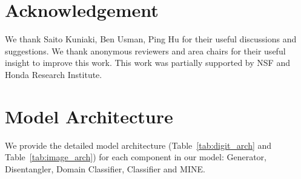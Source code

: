 \documentclass{article}
\begin{document}
\section{Acknowledgement}

We thank Saito Kuniaki, Ben Usman, Ping Hu for their useful discussions and suggestions. We thank anonymous reviewers and area chairs for their useful insight to improve this work. This work was partially supported by NSF and Honda Research Institute. 





\clearpage


\appendix
{}
\section{Model Architecture}
We provide the detailed model architecture (Table~\ref{tab:digit_arch} and Table~\ref{tab:image_arch}) for each component in our model: Generator, Disentangler, Domain Classifier, Classifier and MINE.
\end{document}
